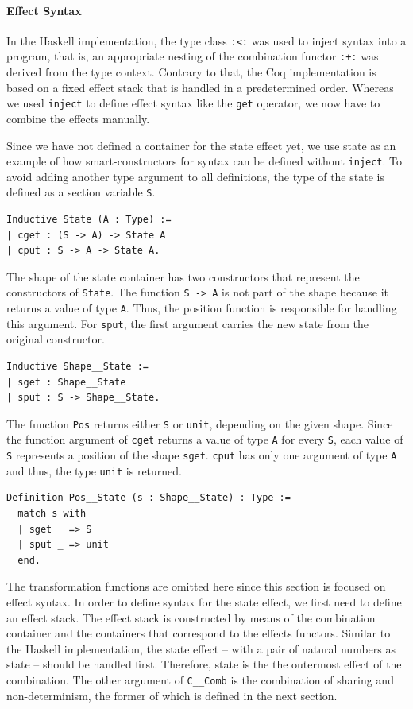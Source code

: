 \documentclass[a4paper, 11pt, fleqn, twoside, abstract=on]{scrreprt}
\newcommand{\hinl}[1]{\texttt{#1}}
\newcommand{\cinl}[1]{\texttt{#1}}
\begin{document}
\paragraph{Effect Syntax}

In the Haskell implementation, the type class \hinl{:<:} was used to inject syntax into a program, that is, an appropriate nesting of the combination functor \hinl{:+:} was derived from the type context.
Contrary to that, the Coq implementation is based on a fixed effect stack that is handled in a predetermined  order.
Whereas we used \hinl{inject} to define effect syntax like the \hinl{get} operator, we now have to combine the effects manually.

Since we have not defined a container for the state effect yet, we use state as an example of how smart-constructors for syntax can be defined without \hinl{inject}.
To avoid adding another type argument to all definitions, the type of the state is defined as a section variable \cinl{S}.

\begin{verbatim}
Inductive State (A : Type) :=
| cget : (S -> A) -> State A
| cput : S -> A -> State A.
\end{verbatim}

The shape of the state container has two constructors that represent the constructors of \cinl{State}.
The function \cinl{S -> A} is not part of the shape because it returns a value of type \cinl{A}.
Thus, the position function is responsible for handling this argument.
For \cinl{sput}, the first argument carries the new state from the original constructor.

\begin{verbatim}
Inductive Shape__State :=
| sget : Shape__State
| sput : S -> Shape__State.
\end{verbatim}

The function \cinl{Pos} returns either \cinl{S} or \cinl{unit}, depending on the given shape.
Since the function argument of \cinl{cget} returns a value of type \cinl{A} for every \cinl{S}, each value of \cinl{S} represents a position of the shape \cinl{sget}.
\cinl{cput} has only one argument of type \cinl{A} and thus, the type \cinl{unit} is returned.

\begin{verbatim}
Definition Pos__State (s : Shape__State) : Type :=
  match s with
  | sget   => S
  | sput _ => unit
  end.
\end{verbatim}

The transformation functions are omitted here since this section is focused on effect syntax.
In order to define syntax for the state effect, we first need to define an effect stack.
The effect stack is constructed by means of the combination container and the containers that correspond to the effects functors.
Similar to the Haskell implementation, the state effect -- with a pair of natural numbers as state -- should be handled first.
Therefore, state is the the outermost effect of the combination.
The other argument of \cinl{C__Comb} is the combination of sharing and non-determinism, the former of which is defined in the next section.
 
\end{document}
